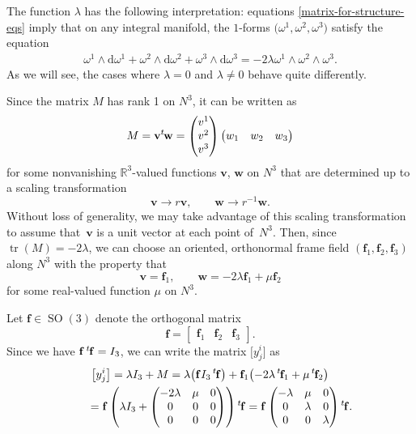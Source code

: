 \documentclass[pdftex]{sigma}
\numberwithin{equation}{section}
\renewcommand{\d}{\mathrm{d}}%
\newcommand{\bbR}{{\mathbb R}}
\newcommand{\SO}{\operatorname{SO}}
\newcommand{\mbf}{\mathbf{f}}
\newcommand{\mbv}{\mathbf{v}}
\newcommand{\mbw}{\mathbf{w}}
\DeclareMathOperator{\tr}{tr}
\begin{document}
\begin{Remark}\label{lambda-remark}The function $\lambda$ has the following interpretation: equations \eqref{matrix-for-structure-eqs} imply that on any integral manifold, the $1$-forms $\big(\omega^1, \omega^2, \omega^3\big)$ satisfy the equation
\begin{gather*}%
\omega^1 \wedge \d \omega^1 + \omega^2 \wedge \d \omega^2 + \omega^3 \wedge \d \omega^3 = -2\lambda \omega^1 \wedge \omega^2 \wedge \omega^3.
\end{gather*}
As we will see, the cases where $\lambda=0$ and $\lambda \neq 0$ behave quite differently.
\end{Remark}

Since the matrix $M$ has rank 1 on $N^3$, it can be written as
\[ M = \mbv {}^t\hskip-1pt\mbw = \begin{pmatrix} v^1 \\ v^2 \\ v^3 \end{pmatrix}
\begin{pmatrix} w_1 & w_2 & w_3 \end{pmatrix} \]
for some nonvanishing $\bbR^3$-valued functions $\mbv$, $\mbw$ on $N^3$ that are determined up to a scaling transformation
\[ \mbv \to r \mbv, \qquad \mbw \to r^{-1} \mbw. \]
Without loss of generality, we may take advantage of this scaling transformation to assume that~$\mbv$ is a unit vector at each point of~$N^3$. Then, since $\tr (M) = -2\lambda$, we can choose an oriented, orthonormal frame field $(\mbf_1, \mbf_2, \mbf_3)$ along $N^3$ with the property that
\[ \mbv = \mbf_1, \qquad \mbw = -2 \lambda \mbf_1 + \mu \mbf_2 \]
for some real-valued function $\mu$ on $N^3$.

Let $\mbf \in \SO(3)$ denote the orthogonal matrix
\[ \mbf = [ \begin{matrix} \mbf_1 & \mbf_2 & \mbf_3\end{matrix}]. \]
Since we have $\mbf \, {}^t\hskip-1pt\mbf = I_3$, we can write the matrix $\big[y^i_j\big]$ as
\begin{gather*}
\big[y^i_j\big] = \lambda I_3 + M = \lambda \big(\mbf I_3 \, {}^t\hskip-1pt\mbf\big) + \mbf_1 \big({-}2\lambda\, {}^t\hskip-1pt \mbf_1 + \mu \, {}^t\hskip-1pt \mbf_2\big) \\
\hphantom{\big[y^i_j\big]}{} = \mbf \left(\lambda I_3 + \begin{pmatrix} -2\lambda & \mu & 0 \\ 0 & 0 & 0 \\ 0 & 0 & 0 \end{pmatrix} \right) {}^t\hskip-1pt\mbf
 = \mbf \begin{pmatrix} -\lambda & \mu & 0 \\ 0 & \lambda & 0 \\ 0 & 0 & \lambda \end{pmatrix} {}^t\hskip-1pt\mbf.
\end{gather*}
\end{document}
